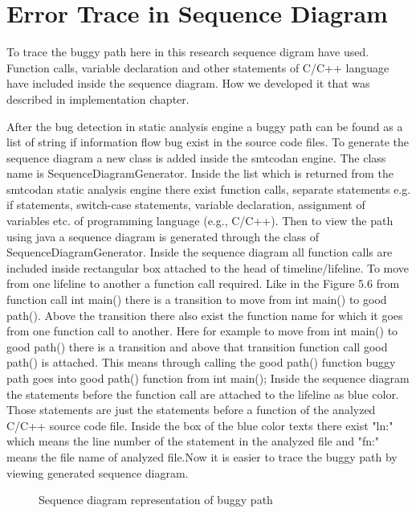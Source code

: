 \section{Error Trace in Sequence Diagram}

To trace the buggy path here in this research sequence digram have used. Function calls, variable declaration and other statements of C/C++ language have included inside the sequence diagram. How we developed it that was described in implementation chapter. 

After the bug detection in static analysis engine a buggy path can be found as a list of string if information flow bug exist in the source code files. To generate the sequence diagram a new class is added inside the smtcodan engine. The class name is SequenceDiagramGenerator. Inside the list which is returned from the smtcodan static analysis engine there
exist function calls, separate statements e.g. if statements, switch-case statements, variable declaration, assignment of variables etc. of programming language (e.g., C/C++). Then to view the path using java a sequence diagram is generated through the class of SequenceDiagramGenerator. Inside the sequence diagram all function calls are included inside rectangular box attached to the head of timeline/lifeline. To move from one lifeline to another a function call
required. Like in the Figure 5.6 from function call int main() there is a transition to move from int
main() to good path(). Above the transition there also exist the function name for which it goes from one function call to another. Here for example to move from int main() to good path() there is a transition and above that transition function call good path() is attached. This means through calling the good path() function buggy path goes into good path() function from int main(); Inside
the sequence diagram the statements before the function call are attached to the lifeline as blue color. Those statements are just the statements before a function of the analyzed C/C++ source code file. Inside the box of the blue color texts there exist "ln:" which means the line number of the statement in the analyzed file and "fn:" means the file name of analyzed file.Now it is easier to trace the buggy path by viewing generated sequence diagram.

\begin{figure}[htbp]
	\centering
	\label{fig:viewSequenceDiagram}
	\caption{Sequence diagram representation of buggy path}
\end{figure}
